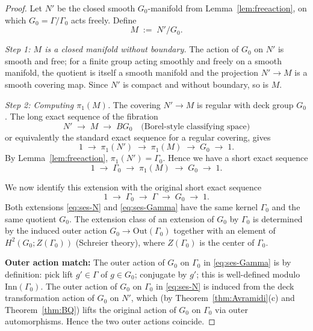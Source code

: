 \documentclass[12pt]{article}
\theoremstyle{definition}
\begin{document}
\begin{proof}
Let $N'$ be the closed smooth $G_0$-manifold from Lemma~\ref{lem:freeaction}, on which $G_0=\Gamma/\Gamma_0$ acts freely. Define
\[
M \;:=\; N'\big/G_0.
\]

\medskip

\noindent\emph{Step 1: $M$ is a closed manifold without boundary.} The action of $G_0$ on $N'$ is smooth and free; for a finite group acting smoothly and freely on a smooth manifold, the quotient is itself a smooth manifold and the projection $N'\to M$ is a smooth covering map. Since $N'$ is compact and without boundary, so is $M$.

\medskip

\noindent\emph{Step 2: Computing $\pi_1(M)$.} The covering $N'\to M$ is regular with deck group $G_0$. The long exact sequence of the fibration
\[
N' \;\to\; M \;\to\; BG_0 \quad\text{(Borel-style classifying space)}
\]
or equivalently the standard exact sequence for a regular covering, gives
\[
1 \;\longrightarrow\; \pi_1(N')\;\longrightarrow\; \pi_1(M) \;\longrightarrow\; G_0 \;\longrightarrow\; 1.
\]
By Lemma~\ref{lem:freeaction}, $\pi_1(N')=\Gamma_0$. Hence we have a short exact sequence
\begin{equation}\label{eq:ses-N}
1 \;\longrightarrow\; \Gamma_0 \;\longrightarrow\; \pi_1(M) \;\longrightarrow\; G_0 \;\longrightarrow\; 1.
\end{equation}

We now identify this extension with the original short exact sequence
\begin{equation}\label{eq:ses-Gamma}
1 \;\longrightarrow\; \Gamma_0 \;\longrightarrow\; \Gamma \;\longrightarrow\; G_0 \;\longrightarrow\; 1.
\end{equation}
Both extensions \eqref{eq:ses-N} and \eqref{eq:ses-Gamma} have the same kernel $\Gamma_0$ and the same quotient $G_0$. The extension class of an extension of $G_0$ by $\Gamma_0$ is determined by the induced outer action $G_0\to\mathrm{Out}(\Gamma_0)$ together with an element of $H^2(G_0;Z(\Gamma_0))$ (Schreier theory), where $Z(\Gamma_0)$ is the center of $\Gamma_0$.

\textbf{Outer action match:} The outer action of $G_0$ on $\Gamma_0$ in \eqref{eq:ses-Gamma} is by definition: pick lift $g'\in\Gamma$ of $g\in G_0$; conjugate by $g'$; this is well-defined modulo $\mathrm{Inn}(\Gamma_0)$. The outer action of $G_0$ on $\Gamma_0$ in \eqref{eq:ses-N} is induced from the deck transformation action of $G_0$ on $N'$, which (by Theorem~\ref{thm:Avramidi}(c) and Theorem~\ref{thm:BQ}) lifts the original action of $G_0$ on $\Gamma_0$ via outer automorphisms. Hence the two outer actions coincide.


\end{proof}
\end{document}
